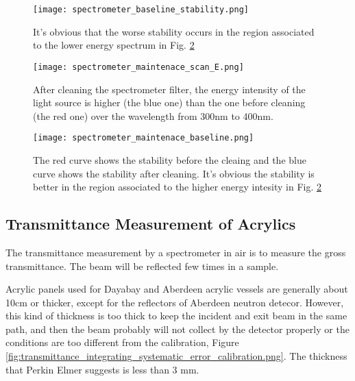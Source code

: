 \begin{figure}
    \centering
    \texttt{[image: spectrometer\_baseline\_stability.png]}
    \caption[The spectrometer baseline stability]
{It's obvious that the worse stability occurs in the region associated to the lower energy spectrum in Fig. \ref{fig:spectrometer_maintenace_scan_E.png}}
    \label{fig:spectrometer_baseline_stability.png}
    \end{figure}


\begin{figure}
    \centering
    \texttt{[image: spectrometer\_maintenace\_scan\_E.png]}
    \caption[The energy spectrum of the light source of Lambda 650]
{
After cleaning the spectrometer filter,
the energy intensity of the light source is higher (the blue one) than the one before cleaning (the red one) over the wavelength from 300nm to 400nm.
}
    \label{fig:spectrometer_maintenace_scan_E.png}
    \end{figure}


\begin{figure}
    \centering
    \texttt{[image: spectrometer\_maintenace\_baseline.png]}
    \caption[The spectrometer baseline stability before and after cleaing the filter]
{
The red curve shows the stability before the cleaing and the blue curve shows the stability after cleaning.
It's obvious the stability is better in the region associated to the higher energy intesity in Fig. \ref{fig:spectrometer_maintenace_scan_E.png}
}
    \label{fig:spectrometer_maintenace_baseline.png}
    \end{figure}




\subsection{Transmittance Measurement of Acrylics}

The transmittance measurement by a spectrometer in air is to measure the gross transmittance.
The beam will be reflected few times in a sample.

Acrylic panels used for Dayabay and Aberdeen acrylic vessels
are generally about 10cm or thicker, except for the reflectors of Aberdeen
neutron detecor. However, this kind of thickness is too thick to
keep the incident and exit beam in the same path, and then
the beam probably will not collect by the detector properly or
the conditions are too different from the calibration, Figure \ref{fig:transmittance_integrating_systematic_error_calibration.png}.
The thickness that Perkin Elmer suggests is less than 3 mm.




